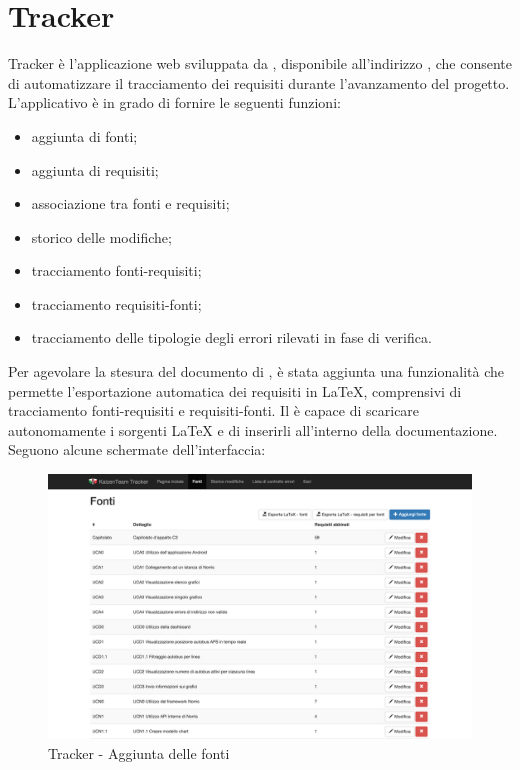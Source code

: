 \section{Tracker} \label{sec:tracker}

Tracker è l'applicazione web sviluppata da \groupname{}, disponibile all'indirizzo , che consente di automatizzare il tracciamento dei requisiti durante l’avanzamento del progetto. \\
L'applicativo è in grado di fornire le seguenti funzioni:
\begin{itemize}
	\item aggiunta di fonti;
	\item aggiunta di requisiti;
	\item associazione tra fonti e requisiti;
	\item storico delle modifiche;
	\item tracciamento fonti-requisiti;
	\item tracciamento requisiti-fonti;
	\item tracciamento delle tipologie degli errori rilevati in fase di verifica.
\end{itemize}

Per agevolare la stesura del documento di , è stata aggiunta una funzionalità che permette l’esportazione automatica dei requisiti in \LaTeX, comprensivi di tracciamento fonti-requisiti e requisiti-fonti. Il  è capace di scaricare autonomamente i sorgenti \LaTeX{} e di inserirli all’interno della documentazione. \\
Seguono alcune schermate dell’interfaccia:

\begin{figure}[H]
	\centering
	\includegraphics[width=\textwidth]{Pics/TrackerFonti}
	\caption{Tracker - Aggiunta delle fonti}
\end{figure}


